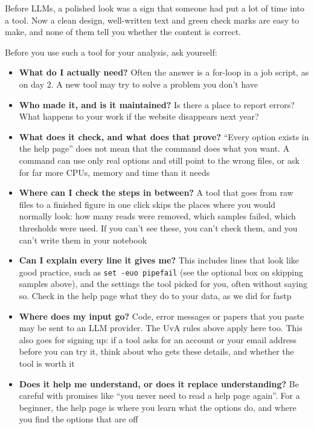 \documentclass[
  letterpaper,
  DIV=11,
  numbers=noendperiod]{scrreprt}
\providecommand{\tightlist}{%
  \setlength{\itemsep}{0pt}\setlength{\parskip}{0pt}}
\begin{document}
Before LLMs, a polished look was a sign that someone had put a lot of
time into a tool. Now a clean design, well-written text and green check
marks are easy to make, and none of them tell you whether the content is
correct.

Before you use such a tool for your analysis, ask yourself:

\begin{itemize}
\tightlist
\item
  \textbf{What do I actually need?} Often the answer is a for-loop in a
  job script, as on day 2. A new tool may try to solve a problem you
  don't have
\item
  \textbf{Who made it, and is it maintained?} Is there a place to report
  errors? What happens to your work if the website disappears next year?
\item
  \textbf{What does it check, and what does that prove?} ``Every option
  exists in the help page'' does not mean that the command does what you
  want. A command can use only real options and still point to the wrong
  files, or ask for far more CPUs, memory and time than it needs
\item
  \textbf{Where can I check the steps in between?} A tool that goes from
  raw files to a finished figure in one click skips the places where you
  would normally look: how many reads were removed, which samples
  failed, which thresholds were used. If you can't see these, you can't
  check them, and you can't write them in your notebook
\item
  \textbf{Can I explain every line it gives me?} This includes lines
  that look like good practice, such as \texttt{set\ -euo\ pipefail}
  (see the optional box on skipping samples above), and the settings the
  tool picked for you, often without saying so. Check in the help page
  what they do to your data, as we did for fastp
\item
  \textbf{Where does my input go?} Code, error messages or papers that
  you paste may be sent to an LLM provider. The UvA rules above apply
  here too. This also goes for signing up: if a tool asks for an account
  or your email address before you can try it, think about who gets
  these details, and whether the tool is worth it
\item
  \textbf{Does it help me understand, or does it replace understanding?}
  Be careful with promises like ``you never need to read a help page
  again''. For a beginner, the help page is where you learn what the
  options do, and where you find the options that are off
\end{itemize}
\end{document}
